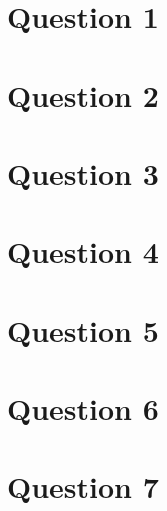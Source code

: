 \documentclass[11pt]{book}
\begin{document}
\maketitle


\section*{Question 1}

\section*{Question 2}

\section*{Question 3}

\section*{Question 4}

\section*{Question 5}

\section*{Question 6}

\section*{Question 7}
\end{document}
